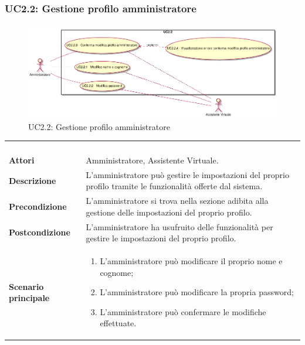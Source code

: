 \newpage\subsubsection{UC2.2: Gestione profilo amministratore}
\label{UC2.2}
\begin{figure}[h]
	\centering
	\includegraphics[width=\textwidth,height=\textheight,keepaspectratio]{images/UseCaseUC22.png}
	\caption{UC2.2: Gestione profilo amministratore}
\end{figure}
\begin{longtable}{l|p{10cm}}
	\rowcolor[gray]{0.8} \multicolumn{2}{c}{} \\
	\rowcolor[gray]{0.8} \multicolumn{2}{c}{\textbf{UC2.2 - Gestione profilo amministratore}} \\
	\rowcolor[gray]{0.8} \multicolumn{2}{c}{} \\
	\hline
	&\\
	\textbf{Attori} & Amministratore, Assistente Virtuale.\\[7pt]
	\textbf{Descrizione} & L'amministratore può gestire le impostazioni del proprio profilo tramite le funzionalità  offerte dal sistema.\\[7pt]
	\textbf{Precondizione} & L'amministratore si trova nella sezione adibita alla gestione delle impostazioni del proprio profilo.\\[7pt]
	\textbf{Postcondizione} & L'amministratore ha usufruito delle funzionalità per gestire le impostazioni del proprio profilo.\\[7pt]
	\textbf{Scenario principale} &\begin{enumerate}
		\item  L'amministratore può modificare il proprio nome e cognome;
		\item  L'amministratore può modificare la propria password;
		\item  L'amministratore può confermare le modifiche effettuate.
	\end{enumerate}
	\\[7pt]\hline
\end{longtable}

